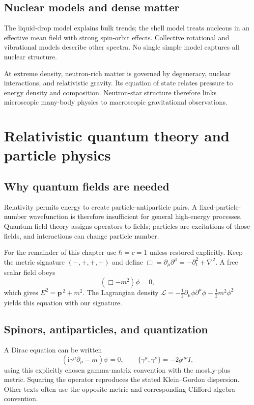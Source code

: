 \documentclass[11pt,oneside]{book}
\newcommand{\ii}{\mathrm{i}}
\newcommand{\vect}[1]{\boldsymbol{#1}}
\newcommand{\lap}{\nabla^2}
\theoremstyle{reviewstyle}
\begin{document}
\section{Nuclear models and dense matter}
The liquid-drop model explains bulk trends; the shell model treats nucleons in an effective mean field with strong spin-orbit effects. Collective rotational and vibrational models describe other spectra. No single simple model captures all nuclear structure.

At extreme density, neutron-rich matter is governed by degeneracy, nuclear interactions, and relativistic gravity. Its equation of state relates pressure to energy density and composition. Neutron-star structure therefore links microscopic many-body physics to macroscopic gravitational observations.

\chapter{Relativistic quantum theory and particle physics}
\section{Why quantum fields are needed}
Relativity permits energy to create particle-antiparticle pairs. A fixed-particle-number wavefunction is therefore insufficient for general high-energy processes. Quantum field theory assigns operators to fields; particles are excitations of those fields, and interactions can change particle number.

For the remainder of this chapter use $\hbar=c=1$ unless restored explicitly. Keep the metric signature $(-,+,+,+)$ and define $\Box=\partial_\mu\partial^\mu=-\partial_t^2+\lap$. A free scalar field obeys
\begin{equation}(\Box-m^2)\phi=0,\end{equation}
which gives $E^2=\vect p^{\,2}+m^2$. The Lagrangian density
$\mathcal L=-\tfrac12\partial_\mu\phi\partial^\mu\phi-\tfrac12m^2\phi^2$ yields this equation with our signature.
\section{Spinors, antiparticles, and quantization}
A Dirac equation can be written
\begin{equation}(\ii\gamma^\mu\partial_\mu-m)\psi=0,\qquad \{\gamma^\mu,\gamma^\nu\}=-2g^{\mu\nu}I,\end{equation}
using this explicitly chosen gamma-matrix convention with the mostly-plus metric. Squaring the operator reproduces the stated Klein--Gordon dispersion. Other texts often use the opposite metric and corresponding Clifford-algebra convention.
\end{document}
